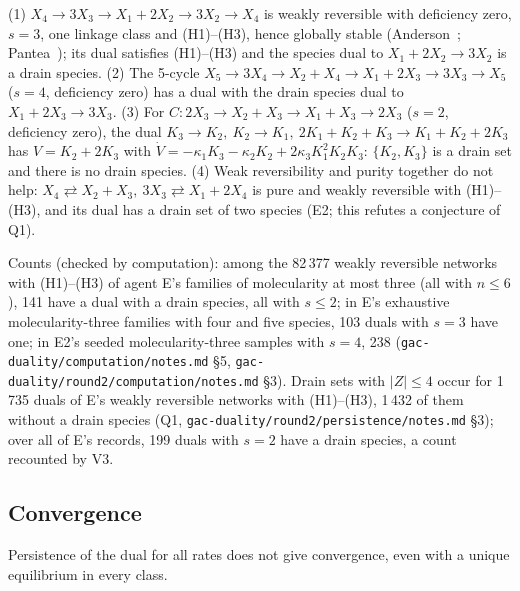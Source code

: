 \documentclass[11pt,a4paper]{report}
\begin{document}
\begin{example}[agents E, E2, Q1]\label{ex:drain}
(1) \(X_4\to3X_3\to X_1+2X_2\to3X_2\to X_4\) is weakly reversible with deficiency zero, \(s=3\), one linkage class and
(H1)--(H3), hence globally stable (Anderson~\autocite{Anderson2011}; Pantea~\autocite{Pantea2012}); its dual satisfies
(H1)--(H3) and the species dual to \(X_1+2X_2\to3X_2\) is a drain species. (2) The 5-cycle
\(X_5\to3X_4\to X_2+X_4\to X_1+2X_3\to3X_3\to X_5\) (\(s=4\), deficiency zero) has a dual with the drain species
dual to \(X_1+2X_3\to3X_3\). (3) For \(C\colon 2X_3\to X_2+X_3\to X_1+X_3\to2X_3\) (\(s=2\), deficiency zero), the
dual \(K_3\to K_2,\ K_2\to K_1,\ 2K_1+K_2+K_3\to K_1+K_2+2K_3\) has \(V=K_2+2K_3\) with
\(\dot V=-\kappa_1K_3-\kappa_2K_2+2\kappa_3K_1^2K_2K_3\): \(\{K_2,K_3\}\) is a drain set and there is no drain species.
(4) Weak reversibility and purity together do not help: \(X_4\rightleftarrows X_2+X_3,\ 3X_3\rightleftarrows X_1+2X_4\)
is pure and weakly reversible with (H1)--(H3), and its dual has a drain set of two species (E2; this refutes a
conjecture of Q1).
\end{example}

Counts (checked by computation): among the 82\,377 weakly reversible networks with (H1)--(H3) of agent E's
families of molecularity at most three (all with \(n\le6\)), 141 have a dual with a drain species, all with \(s\le2\);
in E's exhaustive molecularity-three families with four and five species, 103 duals with \(s=3\) have one; in E2's
seeded molecularity-three samples with \(s=4\), 238 (\texttt{gac-duality/computation/notes.md} §5,
\texttt{gac-duality/round2/computation/notes.md} §3). Drain sets with \(|Z|\le4\) occur for 1\,735 duals of E's weakly
reversible networks with (H1)--(H3), 1\,432 of them without a drain species (Q1,
\texttt{gac-duality/round2/persistence/notes.md} §3); over all of E's records, 199 duals with \(s=2\) have a drain
species, a count recounted by V3.

\subsection{Convergence}

Persistence of the dual for all rates does not give convergence, even with a unique equilibrium in every class.
\end{document}
